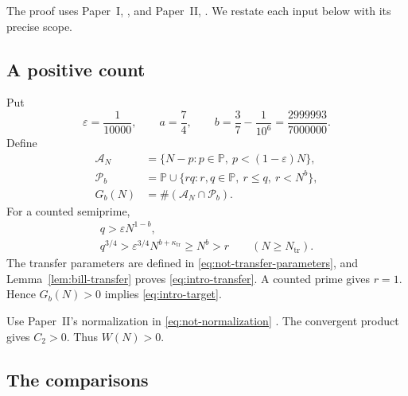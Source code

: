 The proof uses Paper~I,
\cite[Theorems~2.6, 2.8, 3.2 and~4.1]{PaperI}, and Paper~II,
\cite[(1.7)--(1.12), (6.4)--(6.4d)]{PaperII}.
We restate each input below with its precise scope.

\subsection{A positive count}

Put
\begin{equation}\label{eq:intro-exponents}
 \varepsilon=\frac1{10000},\qquad a=\frac74,\qquad
 b=\frac37-\frac1{10^6}=\frac{2999993}{7000000}.
\end{equation}
Define
\begin{equation}\label{eq:intro-count}
\begin{aligned}
 \mathcal A_N&=\{N-p:p\in\mathbb P,\ p<(1-\varepsilon)N\},\\
 \mathcal P_b&=\mathbb P\cup
      \{rq:r,q\in\mathbb P,\ r\le q,\ r<N^b\},\\
 G_b(N)&=\#(\mathcal A_N\cap\mathcal P_b).
\end{aligned}
\end{equation}
For a counted semiprime,
\begin{equation}\label{eq:intro-transfer}
\begin{gathered}
 q>\varepsilon N^{1-b},\\
 q^{3/4}>\varepsilon^{3/4}N^{b+\kappa_{\mathrm{tr}}}\ge N^b>r
 \qquad(N\ge N_{\mathrm{tr}}).
\end{gathered}
\end{equation}
The transfer parameters are defined in \eqref{eq:not-transfer-parameters},
and Lemma~\ref{lem:bill-transfer} proves \eqref{eq:intro-transfer}.
A counted prime gives $r=1$.
Hence $G_b(N)>0$ implies \eqref{eq:intro-target}.

Use Paper~II's normalization in \eqref{eq:not-normalization}
\cite[(1.2), \S6.1]{PaperII}.
The convergent product gives $C_2>0$.
Thus $W(N)>0$.

\subsection{The comparisons}

